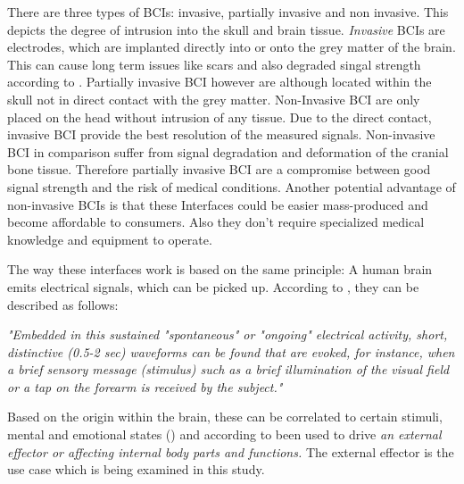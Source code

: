             There are three types of BCIs: invasive, partially invasive and non invasive. This depicts the degree of intrusion into the skull and brain tissue. \textit{Invasive} BCIs are electrodes, which are implanted directly into or onto the grey matter of the brain. This can cause long term issues like scars and also degraded singal strength according to \cite{Abdulkader.2015}. 
            Partially invasive BCI however are although located within the skull not in direct contact with the grey matter.
            Non-Invasive BCI are only placed on the head without intrusion of any tissue.
            Due to the direct contact, invasive BCI provide the best resolution of the measured signals. Non-invasive BCI in comparison suffer from signal degradation and deformation of the cranial bone tissue. 
            Therefore partially invasive BCI are a compromise between good signal strength and the risk of medical conditions.
            Another potential advantage of non-invasive BCIs is that these Interfaces could be easier mass-produced and become affordable to consumers. Also they don't require specialized medical knowledge and equipment to operate.

            The way these interfaces work is based on the same principle: A human brain emits electrical signals, which can be picked up.
            According to \cite{Vidal.1973}, they can be described as follows:

            \medskip
            \emph{"Embedded in this sustained "spontaneous" or "ongoing" electrical activity, short, distinctive (0.5-2 sec) waveforms can be found that are evoked, for instance, when a brief sensory message (stimulus) such as a brief illumination of the visual field or a tap on the forearm is received by the subject."}
            \medskip

            Based on the origin within the brain, these can be correlated to certain stimuli, mental and emotional states (\cite{JardimGoncalves.2018}) and according to \cite{Waldert.2016} been used to drive \emph{an external effector or affecting internal body parts and functions.} The external effector is the use case which is being examined in this study.

